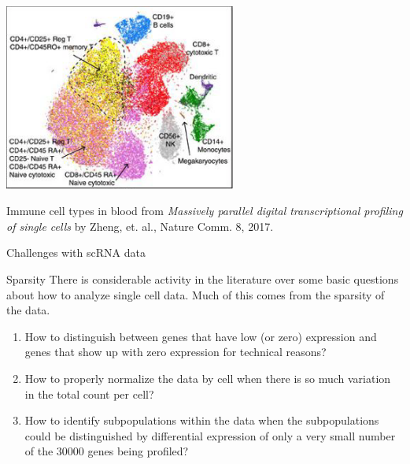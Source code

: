\documentclass{beamer}
\begin{document}
\begin{frame}
  \begin{center}
      \includegraphics[width=3in]{blood.png}

      Immune cell types in blood from \textit{Massively parallel digital transcriptional profiling of single cells} by Zheng, et. al., Nature Comm. 8, 2017.
\end{center} 
\end{frame}

\begin{frame}{Challenges with scRNA data}
  \begin{block}{Sparsity}
    There is considerable activity in the literature over some basic questions about how to analyze single cell data.
    Much of this comes from the sparsity of the data.
    \begin{enumerate}
          \item How to distinguish between genes that have low (or zero) expression and
            genes that show up with zero expression for technical reasons?
          \item How to properly normalize the data by cell when there is so much variation in the total count per cell?
          \item How to identify subpopulations within the data when the subpopulations could be distinguished by differential expression of only a very small number of the 30000 genes being profiled?
          \end{enumerate}
\end{block}
\end{frame}
\end{document}
